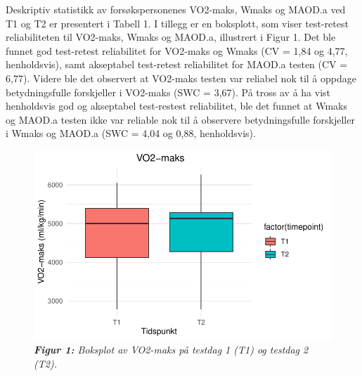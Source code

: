 \documentclass[
  letterpaper,
  DIV=11,
  numbers=noendperiod]{scrreprt}
\begin{document}
Deskriptiv statistikk av forsøkspersonenes VO2-maks, Wmaks og MAOD.a ved
T1 og T2 er presentert i Tabell 1. I tillegg er en boksplott, som viser
test-retest reliabiliteten til VO2-maks, Wmaks og MAOD.a, illustrert i
Figur 1. Det ble funnet god test-retest reliabilitet for VO2-maks og
Wmaks (CV = 1,84 og 4,77, henholdsvis), samt akseptabel test-retest
reliabilitet for MAOD.a testen (CV = 6,77). Videre ble det observert at
VO2-maks testen var reliabel nok til å oppdage betydningsfulle
forskjeller i VO2-maks (SWC = 3,67). På tross av å ha vist henholdsvis
god og akseptabel test-restest reliabilitet, ble det funnet at Wmaks og
MAOD.a testen ikke var reliable nok til å observere betydningsfulle
forskjeller i Wmaks og MAOD.a (SWC = 4,04 og 0,88, henholdsvis).

\begin{figure}

{\centering \includegraphics{01-reliabilitet_files/figure-pdf/unnamed-chunk-2-1.pdf}

}

\caption{\emph{\textbf{Figur 1:} Boksplot av VO2-maks på testdag 1 (T1)
og testdag 2 (T2).}}

\end{figure}
\end{document}
